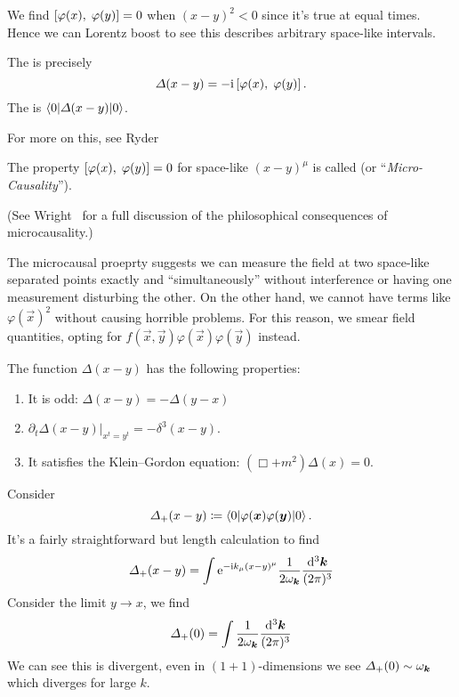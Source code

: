  We find $\left\lbrack\varphi(x),\;\varphi(y)\right\rbrack=0$ when
$(x-y)^{2}<0$ since it's true at equal times. Hence we can Lorentz boost
to see this describes arbitrary space-like intervals.

The 
is precisely
\begin{equation}
\varDelta(x-y) = -\mathrm{i}\left\lbrack\varphi(x),\;\varphi(y)\right\rbrack.
\end{equation}
The 
is $\braket{0|\varDelta(x-y)|0}$.

\begin{remark}
For more on this, see Ryder~\cite[\S4.2 and \S6.1]{Ryder:1985wq}
\end{remark}

The property $\left\lbrack\varphi(x),\;\varphi(y)\right\rbrack=0$ for space-like
$(x-y)^{\mu}$ is called 
(or ``\emph{Micro-Causality\/}'').

(See Wright~\cite{wright2012thesis} for a full discussion of the
philosophical consequences of microcausality.)

The microcausal proeprty suggests we can measure the field at two
space-like separated points exactly and ``simultaneously'' without
interference or having one measurement disturbing the other. On
the other hand, we cannot have terms like $\varphi(\vec{x})^{2}$
without causing horrible problems. For this reason, we
smear
field quantities, opting for
$f(\vec{x}, \vec{y})\varphi(\vec{x})\varphi(\vec{y})$
instead.

\begin{theorem}
The function $\Delta(x-y)$ has the following properties:
\begin{enumerate}
\item It is odd: $\Delta(x-y)=-\Delta(y-x)$
\item $\left.\partial_{t}\Delta(x-y)\right|_{x^{t}=y^{t}} = -\delta^{3}(x-y)$.
\item It satisfies the Klein--Gordon equation: $(\Box + m^{2})\Delta(x)=0$.
\end{enumerate}
\end{theorem}

\M
Consider
\begin{equation}
\Delta_{+}(x-y)\eqDef\braket{\vacuum|\varphi(\vec{x})\varphi(\vec{y})|\vacuum}.
\end{equation}
It's a fairly straightforward but length calculation to find
\begin{equation}
\Delta_{+}(x-y)=\int\E^{-\I
k_{\mu}(x-y)^{\mu}}\frac{1}{2\omega_{\vec{k}}}\frac{\D^{3}\vec{k}}{(2\pi)^{3}}
\end{equation}
Consider the limit $y\to x$, we find
\begin{equation}
\Delta_{+}(0)=\int
\frac{1}{2\omega_{\vec{k}}}\frac{\D^{3}\vec{k}}{(2\pi)^{3}}
\end{equation}
We can see this is divergent, even in $(1+1)$-dimensions we see
$\Delta_{+}(0)\looksLike\omega_{\vec{k}}$ which diverges for large $k$.

